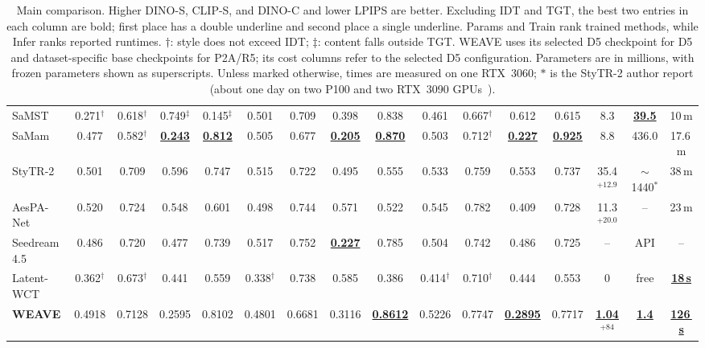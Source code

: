 \documentclass[letterpaper]{article}
\begin{document}
\begin{table}[t!]
{\begin{tabular}{@{}lccccccccccccccc@{}}
SaMST & 0.271$^{\dagger}$ & 0.618$^{\dagger}$ & 0.749$^{\ddagger}$ & 0.145$^{\ddagger}$ & 0.501 & 0.709 & 0.398 & 0.838 & 0.461 & 0.667$^{\dagger}$ & 0.612 & 0.615 & 8.3 & \underline{\textbf{39.5}} & 10\,m \\
SaMam & 0.477 & 0.582$^{\dagger}$ & \underline{\textbf{0.243}} & \underline{\textbf{0.812}} & 0.505 & 0.677 & \underline{\underline{\textbf{0.205}}} & \underline{\underline{\textbf{0.870}}} & 0.503 & 0.712$^{\dagger}$ & \underline{\underline{\textbf{0.227}}} & \underline{\underline{\textbf{0.925}}} & 8.8 & 436.0 & 17.6\,m \\
StyTR-2 & 0.501 & 0.709 & 0.596 & 0.747 & 0.515 & 0.722 & 0.495 & 0.555 & 0.533 & 0.759 & 0.553 & 0.737 & 35.4$^{+12.9}$ & $\sim$1440$^{\ast}$ & 38\,m \\
AesPA-Net & 0.520 & 0.724 & 0.548 & 0.601 & 0.498 & 0.744 & 0.571 & 0.522 & 0.545 & 0.782 & 0.409 & 0.728 & 11.3$^{+20.0}$ & -- & 23\,m \\
Seedream 4.5 & 0.486 & 0.720 & 0.477 & 0.739 & 0.517 & 0.752 & \underline{\textbf{0.227}} & 0.785 & 0.504 & 0.742 & 0.486 & 0.725 & -- & API & -- \\
Latent-WCT & 0.362$^{\dagger}$ & 0.673$^{\dagger}$ & 0.441 & 0.559 & 0.338$^{\dagger}$ & 0.738 & 0.585 & 0.386 & 0.414$^{\dagger}$ & 0.710$^{\dagger}$ & 0.444 & 0.553 & 0 & free & \underline{\underline{\textbf{18\,s}}} \\
\midrule
\textbf{WEAVE} & 0.4918 & 0.7128 & 0.2595 & 0.8102 & 0.4801 & 0.6681 & 0.3116 & \underline{\textbf{0.8612}} & 0.5226 & 0.7747 & \underline{\textbf{0.2895}} & 0.7717 & \underline{\underline{\textbf{1.04$^{+84}$}}} & \underline{\underline{\textbf{1.4}}} & \underline{\textbf{126\,s}} \\
\bottomrule
\end{tabular}%
}
\caption{Main comparison. Higher DINO-S, CLIP-S, and DINO-C and lower LPIPS are better. Excluding IDT and TGT, the best two entries in each column are bold; first place has a double underline and second place a single underline. Params and Train rank trained methods, while Infer ranks reported runtimes. $\dagger$: style does not exceed IDT; $\ddagger$: content falls outside TGT. WEAVE uses its selected D5 checkpoint for D5 and dataset-specific base checkpoints for P2A/R5; its cost columns refer to the selected D5 configuration. Parameters are in millions, with frozen parameters shown as superscripts. Unless marked otherwise, times are measured on one RTX~3060; $\ast$ is the StyTR-2 author report (about one day on two P100 and two RTX~3090 GPUs~\cite{deng2022stytr2}).}
\label{tab:main}
\end{table}
\end{document}
